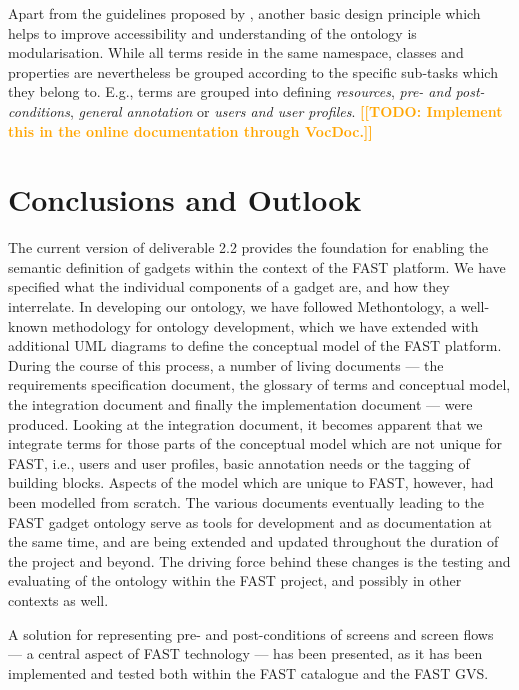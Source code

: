\documentclass[twoside]{fast_latex}
\newcommand{\todo}[1]{\textsf{\textbf{\textcolor{Orange}{[[TODO: #1]]}}}}
\newcommand{\todo}[1]{}
\begin{document}
Apart from the guidelines proposed by \cite{moeller2009ontology_soft_skills}, another basic design principle which helps to improve accessibility and understanding of the ontology is modularisation. While all terms reside in the same namespace, classes and properties are nevertheless be grouped according to the specific sub-tasks which they belong to. E.g., terms are grouped into defining \emph{resources}, \emph{pre- and post-conditions}, \emph{general annotation} or \emph{users and user profiles}. \todo{Implement this in the online documentation through VocDoc.}



\section{Conclusions and Outlook} %
\label{sec:conclusions}

The current version of deliverable 2.2 provides the foundation for enabling the semantic definition of gadgets within the context of the FAST platform. We have specified what the individual components of a gadget are, and how they interrelate. In developing our ontology, we have followed Methontology, a well-known methodology for ontology development, which we have extended with additional UML diagrams to define the conceptual model of the FAST platform. During the course of this process, a number of living documents --- the requirements specification document, the glossary of terms and conceptual model, the integration document and finally the implementation document --- were produced. 
Looking at the integration document, it becomes apparent that we integrate terms for those parts of the conceptual model which are not unique for FAST, i.e., users and user profiles, basic annotation needs or the tagging of building blocks. Aspects of the model which are unique to FAST, however, had been modelled from scratch.
The various documents eventually leading to the FAST gadget ontology serve as tools for development and as documentation at the same time, and are being extended and updated throughout the duration of the project and beyond. The driving force behind these changes is the testing and evaluating of the ontology within the FAST project, and possibly in other contexts as well.

A solution for representing pre- and post-conditions of screens and screen flows --- a central aspect of FAST technology --- has been presented, as it has been implemented and tested both within the FAST catalogue and the FAST GVS.
\end{document}
